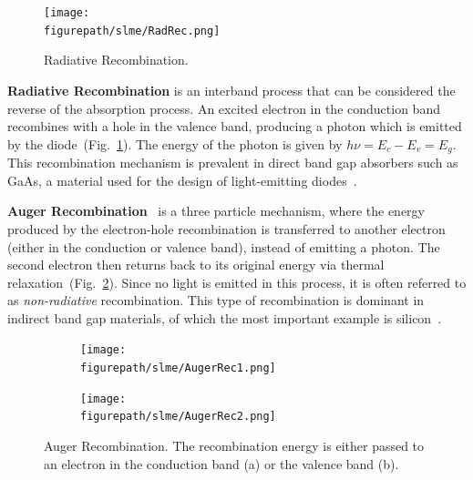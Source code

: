 \begin{refsection}
\begin{figure}
\vspace{-3em}
\centering 
\texttt{[image: \\figurepath/slme/RadRec.png]} 
\caption{\label{slme:fig-radrec} Radiative Recombination.} 
\end{figure}
\vspace{1em}
\textbf{Radiative Recombination} is an interband process that can be 
considered the reverse of the absorption process. An excited electron in the 
conduction band recombines with a hole in the valence band, producing a photon 
which is emitted by the diode~(Fig.~\ref{slme:fig-radrec}). The energy of the 
photon is given by $h \nu = E_c - E_v = E_g$. This recombination mechanism is 
prevalent in direct band gap absorbers such as GaAs, a material used for the 
design of light-emitting diodes~\cite{Green1981}. 

\pagebreak[4]
\textbf{Auger Recombination}~\cite{Auger1923} is a three particle 
mechanism, where the energy produced by the electron-hole recombination is 
transferred to another electron (either in the conduction or valence band), 
instead of emitting a photon. The second electron then returns back to its 
original energy via thermal relaxation~(Fig.~\ref{slme:fig-augerrec}). Since 
no light is emitted in this process, it is often referred to as 
\textit{non-radiative} recombination. This type of recombination is dominant 
in indirect band gap materials, of which the most important example is 
silicon~\cite{Nilsson1973}. 
\begin{figure}[ht]  
\centering
\captionsetup{width=0.9\textwidth} 
\begin{subfigure}{0.50\textwidth} 
\centering 
\texttt{[image: \\figurepath/slme/AugerRec1.png]} 
\caption{} 
\end{subfigure}%
\begin{subfigure}{0.50\textwidth} 
\centering 
\texttt{[image: \\figurepath/slme/AugerRec2.png]} 
\caption{} 
\end{subfigure} 
\caption{\label{slme:fig-augerrec}Auger Recombination. The recombination 
energy is either passed to an electron in the conduction band (a) or the 
valence band (b).} 
\end{figure} 


\end{refsection}
